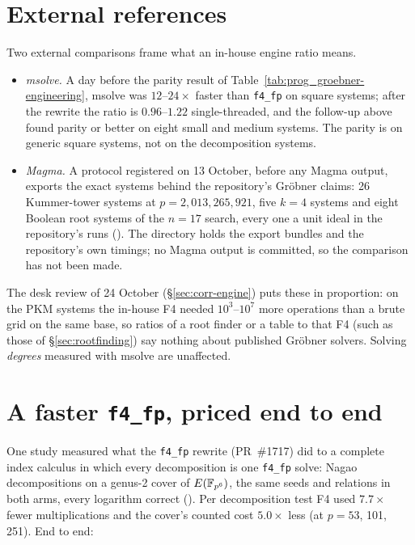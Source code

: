 \section{External references}\label{sec:fe-external}

Two external comparisons frame what an in-house engine ratio means.
\begin{itemize}
\item \emph{msolve.} A day before the parity result of
  Table~\ref{tab:prog_groebner-engineering}, msolve was $12$--$24\times$
  faster than \texttt{f4\_fp} on square systems; after the rewrite the
  ratio is $0.96$--$1.22$ single-threaded, and the follow-up above found
  parity or better on eight small and medium systems. The parity is on
  generic square systems, not on the decomposition systems.
\item \emph{Magma.} A protocol registered on 13 October, before any Magma
  output, exports the exact systems behind the repository's Gr\"obner claims:
  26 Kummer-tower systems at $p=2{,}013{,}265{,}921$, five $k=4$ systems and
  eight Boolean root systems of the $n=17$ search, every one a unit ideal in
  the repository's runs ().
  The directory holds the export bundles and the repository's own timings;
  no Magma output is committed, so the comparison has not been made.
\end{itemize}
The desk review of 24 October (\S\ref{sec:corr-engine}) puts these in
proportion: on the PKM systems the in-house F4 needed $10^3$--$10^7$ more
operations than a brute grid on the same base, so ratios of a root finder or
a table to that F4 (such as those of \S\ref{sec:rootfinding}) say nothing
about published Gr\"obner solvers. Solving \emph{degrees} measured with
msolve are unaffected.

\section{A faster \texttt{f4\_fp}, priced end to end}\label{sec:fe-e2e}

One study measured what the \texttt{f4\_fp} rewrite (PR~\#1717) did to a
complete index calculus in which every decomposition is one \texttt{f4\_fp}
solve: Nagao decompositions on a genus-2 cover of $E(\mathbb{F}_{p^6})$, the same
seeds and relations in both arms, every logarithm correct
(). Per decomposition test
F4 used $7.7\times$ fewer multiplications and the cover's counted cost
$5.0\times$ less (at $p=53$, 101, 251). End to end:

